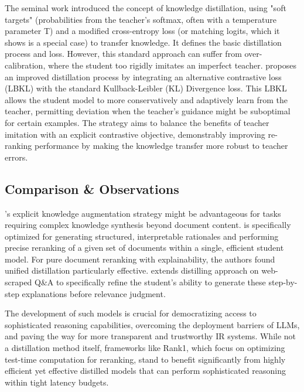 \documentclass[runningheads]{llncs}
\begin{document}
The seminal work \cite{hinton2015distillingknowledgeneuralnetwork} introduced the concept of knowledge distillation, using "soft targets" (probabilities from the teacher's softmax, often with a temperature parameter T) and a modified cross-entropy loss (or matching logits, which it shows is a special case) to transfer knowledge. It defines the basic distillation process and loss. However, this standard approach can suffer from over-calibration, where the student too rigidly imitates an imperfect teacher. \cite{10.1145/3578337.3605120} proposes an improved distillation process by integrating an alternative contrastive loss (LBKL) with the standard Kullback-Leibler (KL) Divergence loss\cite{10.1214/aop/1176996454}. This LBKL allows the student model to more conservatively and adaptively learn from the teacher, permitting deviation when the teacher's guidance might be suboptimal for certain examples. The strategy aims to balance the benefits of teacher imitation with an explicit contrastive objective, demonstrably improving re-ranking performance by making the knowledge transfer more robust to teacher errors.

\subsection{Comparison \& Observations}

\cite{kang2023knowledgeaugmentedreasoningdistillationsmall}'s explicit knowledge augmentation strategy might be advantageous for tasks requiring complex knowledge synthesis beyond document content. \cite{ji2025reasoningrankteachingstudentmodels} is specifically optimized for generating structured, interpretable rationales and performing precise reranking of a given set of documents within a single, efficient student model. For pure document reranking with explainability, the authors found unified distillation particularly effective. \cite{samarinas2025distillationrefinementreasoningsmall} extends \cite{ji2025reasoningrankteachingstudentmodels} distilling approach on web-scraped Q\&A to specifically refine the student's ability to generate these step-by-step explanations before relevance judgment.

The development of such models is crucial for democratizing access to sophisticated reasoning capabilities, overcoming the deployment barriers of LLMs, and paving the way for more transparent and trustworthy IR systems. While not a distillation method itself, frameworks like Rank1\cite{weller2025rank1testtimecomputereranking}, which focus on optimizing test-time computation for reranking, stand to benefit significantly from highly efficient yet effective distilled models that can perform sophisticated reasoning within tight latency budgets.
\end{document}
